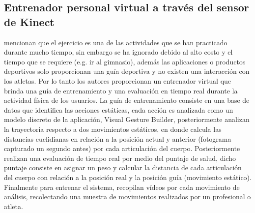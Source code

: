 \subsection{Entrenador personal virtual a trav\'es del sensor de Kinect} \label{tr:6}
 mencionan que el ejercicio es una de las actividades que se han practicado durante mucho tiempo, sin embargo se ha ignorado debido al alto costo y el tiempo que se requiere (e.g. ir al gimnasio), adem\'as las aplicaciones o productos deportivos solo proporcionan una gu\'ia deportiva y no existen una interacci\'on con los atletas. Por lo tanto los autores proporcionan un entrenador virtual que brinda una gu\'ia de entrenamiento y una evaluaci\'on en tiempo real durante la actividad f\'isica de los usuarios.
\medbreak
La gu\'ia de entrenamiento consiste en una base de datos que identifica las acciones est\'aticas, cada acci\'on es analizada como un modelo discreto de la aplicaci\'on, Visual Gesture Builder, posteriormente analizan la trayectoria  respecto a dos movimientos est\'aticos, en donde calcula las distancias euclidianas en relaci\'on a la posici\'on actual y anterior (fotograma capturado un segundo antes) por cada articulaci\'on del cuerpo.
\medbreak 
Posteriormente realizan una evaluaci\'on de tiempo real por medio del puntaje de salud, dicho puntaje consiste en asignar un peso y calcular la distancia de cada articulaci\'on del cuerpo con relaci\'on a  la posici\'on real y la posici\'on gu\'ia (movimiento est\'atico).
\medbreak 
Finalmente para entrenar el sistema,  recopilan v\'ideos por cada movimiento de an\'alisis, recolectando una muestra  de movimientos realizados por un profesional o atleta.
